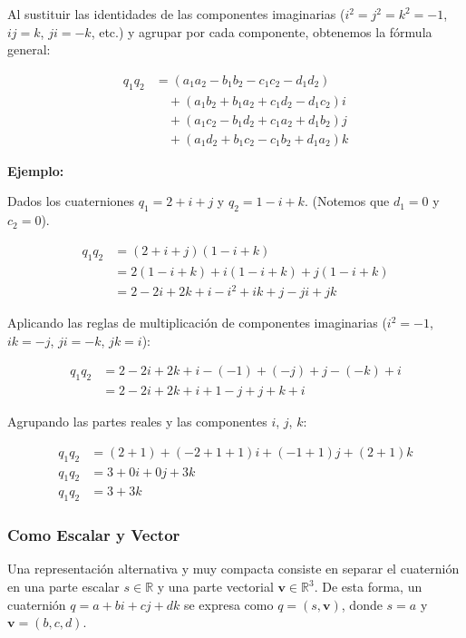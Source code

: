 Al sustituir las identidades de las componentes imaginarias ($i^2=j^2=k^2=-1$, $ij=k$, $ji=-k$, etc.) y agrupar por cada componente, obtenemos la fórmula general:

\begin{align*}
    q_1 q_2 &= (a_1 a_2 - b_1 b_2 - c_1 c_2 - d_1 d_2) \\
    &\quad + (a_1 b_2 + b_1 a_2 + c_1 d_2 - d_1 c_2)i \\
    &\quad + (a_1 c_2 - b_1 d_2 + c_1 a_2 + d_1 b_2)j \\
    &\quad + (a_1 d_2 + b_1 c_2 - c_1 b_2 + d_1 a_2)k
\end{align*}

\textbf{Ejemplo:}

Dados los cuaterniones $q_1 = 2 + i + j$ y $q_2 = 1 - i + k$. (Notemos que $d_1 = 0$ y $c_2 = 0$).

\begin{align*}
    q_1 q_2 &= (2 + i + j)(1 - i + k) \\
    &= 2(1 - i + k) + i(1 - i + k) + j(1 - i + k) \\
    &= 2 - 2i + 2k + i - i^2 + ik + j - ji + jk
\end{align*}

Aplicando las reglas de multiplicación de componentes imaginarias ($i^2 = -1$, $ik = -j$, $ji = -k$, $jk = i$):

\begin{align*}
    q_1 q_2 &= 2 - 2i + 2k + i - (-1) + (-j) + j - (-k) + i \\
    &= 2 - 2i + 2k + i + 1 - j + j + k + i
\end{align*}

Agrupando las partes reales y las componentes $i$, $j$, $k$:

\begin{align*}
    q_1 q_2 &= (2 + 1) + (-2 + 1 + 1)i + (-1 + 1)j + (2 + 1)k \\
    q_1 q_2 &= 3 + 0i + 0j + 3k \\
    q_1 q_2 &= 3 + 3k
\end{align*}

\subsubsection{Como Escalar y Vector}
Una representación alternativa y muy compacta consiste en separar el cuaternión en una parte escalar $s \in \mathbb{R}$ y una parte vectorial $\mathbf{v} \in \mathbb{R}^3$. De esta forma, un cuaternión $q = a + bi + cj + dk$ se expresa como $q = (s, \mathbf{v})$, donde $s = a$ y $\mathbf{v} = (b, c, d)$. 


